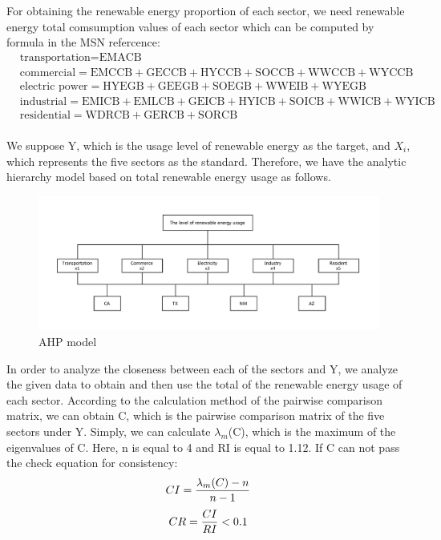 \documentclass[a4paper,11pt]{article}
\begin{document}
\par For obtaining the renewable energy proportion of each sector, we need renewable energy total comsumption values of each sector which can be computed by formula in the MSN refercence:
\begin{align*}
& \text{transportation} = \text{EMACB} \\
& \text{commercial} = \text{EMCCB} + \text{GECCB} + \text{HYCCB} + \text{SOCCB} + \text{WWCCB} + \text{WYCCB} \\
& \text{electric power} = \text{HYEGB} + \text{GEEGB} + \text{SOEGB} + \text{WWEIB} + \text{WYEGB} \\
& \text{industrial} = \text{EMICB} + \text{EMLCB} + \text{GEICB} + \text{HYICB} + \text{SOICB} + \text{WWICB} + \text{WYICB} \\
& \text{residential} = \text{WDRCB} + \text{GERCB} + \text{SORCB} \\
\end{align*}

\par We suppose Y, which is the usage level of renewable energy as the target, and $X_i$, which represents the five sectors as the standard. Therefore, we have the analytic hierarchy model based on total renewable energy usage as follows.\cite{6}

\begin{figure}[H] 
    \centering 
    \includegraphics[width=1.0\textwidth]{./Pic/AHP.pdf}
    \caption{AHP model}
\end{figure}

\par In order to analyze the closeness between each of the sectors and Y, we analyze the given data to obtain and then use the total of the renewable energy usage of each sector. According to the calculation method of the pairwise comparison matrix, we can obtain C, which is the pairwise comparison matrix of the five sectors under Y. Simply, we can calculate $\lambda_m$(C), which is the maximum of the eigenvalues of C. Here, n is equal to 4 and RI is equal to 1.12.\cite{6} If C can not pass the check equation for consistency:
\begin{equation}
    \centering
    CI=\frac{ \lambda_m(C)-n }{ n-1 }
\end{equation}
\begin{equation}
        \centering
    CR=\frac{ CI }{ RI }<0.1 
\end{equation}
\end{document}
